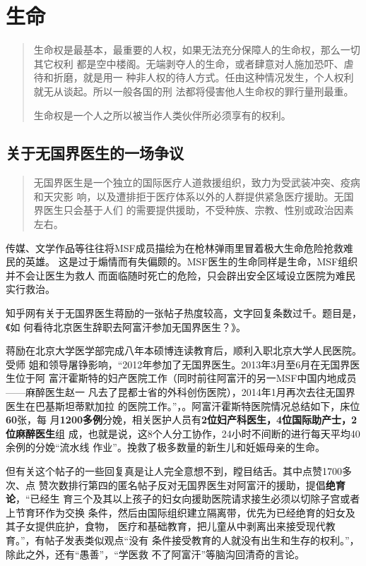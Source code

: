 \chapter{生命}

\begin{quotation}
  生命权是最基本，最重要的人权，如果无法充分保障人的生命权，那么一切其它权利
  都是空中楼阁。无端剥夺人的生命，或者肆意对人施加恐吓、虐待和折磨，就是用一
  种非人权的待人方式。任由这种情况发生，个人权利就无从谈起。所以一般各国的刑
  法都将侵害他人生命权的罪行量刑最重。

  生命权是一个人之所以被当作人类伙伴所必须享有的权利。\cite{renquanwiki}
\end{quotation}

\section{关于无国界医生的一场争议}

\begin{quotation}
  无国界医生是一个独立的国际医疗人道救援组织，致力为受武装冲突、疫病和天灾影
  响，以及遭排拒于医疗体系以外的人群提供紧急医疗援助。无国界医生只会基于人们
  的需要提供援助，不受种族、宗教、性别或政治因素左右。
\end{quotation}

传媒、文学作品等往往将MSF成员描绘为在枪林弹雨里冒着极大生命危险抢救难民的英雄。
这是过于煽情而有失偏颇的。MSF医生的生命同样是生命，MSF组织并不会让医生为救人
而面临随时死亡的危险，只会辟出安全区域设立医院为难民实行救治。

知乎网有关于无国界医生蒋励的一张帖子热度较高，文字回复条数过千。题目是，《如
何看待北京医生辞职去阿富汗参加无国界医生？》。\cite{kandaijiangli}

蒋励在北京大学医学部完成八年本硕博连读教育后，顺利入职北京大学人民医院。受师
姐和领导屠铮影响，“2012年参加了无国界医生。2013年3月至6月在无国界医生位于阿
富汗霍斯特的妇产医院工作（同时前往阿富汗的另一MSF中国内地成员——麻醉医生赵一
凡去了昆都士省的外科创伤医院），2014年1月再次去往无国界医生在巴基斯坦蒂默加拉
的医院工作。”，\cite{jiangli}。阿富汗霍斯特医院情况总结如下，床位\textbf{60}张，每
月\textbf{1200多例}分娩，相关医护人员有\textbf{2位妇产科医生，4位国际助产士，2位麻醉医生}组
成，也就是说，这8个人分工协作，24小时不间断的进行每天平均40余例的分娩“流水线
作业”。挽救了极多数量的新生儿和妊娠母亲的生命。

但有关这个帖子的一些回复真是让人完全意想不到，瞠目结舌。其中点赞1700多次、点
赞次数排行第四的匿名帖子反对无国界医生对阿富汗的援助，提倡\textbf{绝育论}，“已经生
育三个及其以上孩子的妇女向援助医院请求接生必须以切除子宫或者上节育环作为交换
条件，然后由国际组织建立隔离带，优先为已经绝育的妇女及其子女提供庇护，食物，
医疗和基础教育，把儿童从中剥离出来接受现代教育。”，有帖子发表类似观点“没有
条件接受教育的人就没有出生和生存的权利。”，除此之外，还有“愚善”，“学医救
不了阿富汗”等脑沟回清奇的言论。

